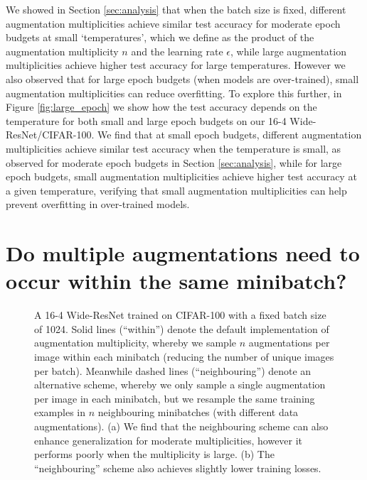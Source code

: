 \documentclass{article}
\begin{document}
We showed in Section \ref{sec:analysis} that when the batch size is fixed, different augmentation multiplicities achieve similar test accuracy for moderate epoch budgets at small `temperatures', which we define as the product of the augmentation multiplicity $n$ and the learning rate $\epsilon$, while large augmentation multiplicities achieve higher test accuracy for large temperatures. However we also observed that for large epoch budgets (when models are over-trained), small augmentation multiplicities can reduce overfitting. To explore this further, in Figure \ref{fig:large_epoch} we show how the test accuracy depends on the temperature for both small and large epoch budgets on our 16-4 Wide-ResNet/CIFAR-100. We find that at small epoch budgets, different augmentation multiplicities achieve similar test accuracy when the temperature is small, as observed for moderate epoch budgets in Section \ref{sec:analysis}, while for large epoch budgets, small augmentation multiplicities achieve higher test accuracy at a given temperature, verifying that small augmentation multiplicities can help prevent overfitting in over-trained models.

\section{Do multiple augmentations need to occur within the same minibatch?}
\label{app:ablation}
\begin{figure}[t]
\centering
  \vskip -1mm

  \vskip -2mm
\caption{A 16-4 Wide-ResNet trained on CIFAR-100 with a fixed batch size of 1024. Solid lines (``within'') denote the default implementation of augmentation multiplicity, whereby we sample $n$ augmentations per image within each minibatch (reducing the number of unique images per batch). Meanwhile dashed lines (``neighbouring'') denote an alternative scheme, whereby we only sample a single augmentation per image in each minibatch, but we resample the same training examples in $n$ neighbouring minibatches (with different data augmentations). (a) We find that the neighbouring scheme can also enhance generalization for moderate multiplicities, however it performs poorly when the multiplicity is large. (b) The ``neighbouring'' scheme also achieves slightly lower training losses.}
\label{fig:ablation}
  \vskip -2mm
\end{figure}
\end{document}
